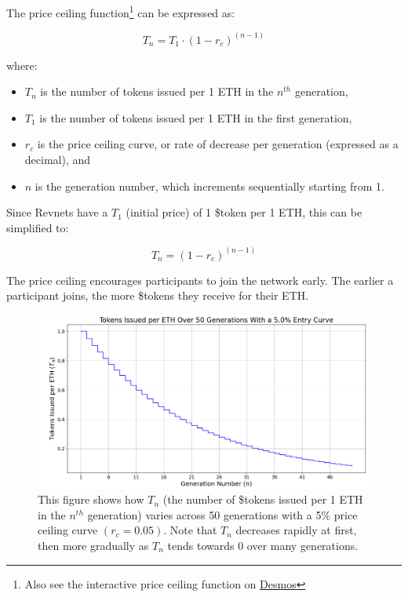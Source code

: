 \documentclass{article}
\begin{document}
The price ceiling function\footnote{Also see the interactive price ceiling function on \href{https://www.desmos.com/calculator/ey9fhuslwe}{Desmos}} can be expressed as:

\begin{equation}
  T_n = T_1 \cdot (1 - r_c)^{(n - 1)}
\end{equation}

where:
\begin{itemize}
  \item $T_n$ is the number of tokens issued per 1 ETH in the $n^{th}$ generation,
  \item $T_1$ is the number of tokens issued per 1 ETH in the first generation,
  \item $r_c$ is the price ceiling curve, or rate of decrease per generation (expressed as a decimal), and
  \item $n$ is the generation number, which increments sequentially starting from 1.
\end{itemize}

Since Revnets have a $T_1$ (initial price) of 1 \$token per 1 ETH, this can be simplified to:

\begin{equation}
  T_n = (1 - r_c)^{(n - 1)}
\end{equation}

The price ceiling encourages participants to join the network early. The earlier a participant joins, the more \$tokens they receive for their ETH.

\begin{figure}[h]
  \centering
  \includegraphics[width=\textwidth]{figures/single-entry-curve.png}
   \caption{This figure shows how $T_n$ (the number of \$tokens issued per 1 ETH in the $n^{th}$ generation) varies across 50 generations with a 5\% price ceiling curve $(r_c = 0.05)$. Note that $T_n$ decreases rapidly at first, then more gradually as $T_n$ tends towards 0 over many generations.}
\end{figure}
\end{document}
